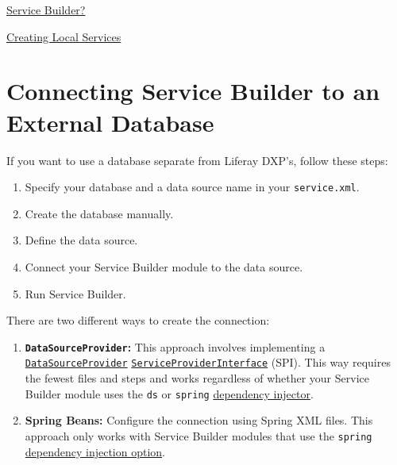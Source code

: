 \href{/docs/7-2/appdev/-/knowledge_base/a/service-builder}{Service
Builder?}

\href{/docs/7-2/appdev/-/knowledge_base/a/business-logic-with-service-builder}{Creating
Local Services}

\chapter{Connecting Service Builder to an External
Database}\label{connecting-service-builder-to-an-external-database}

If you want to use a database separate from Liferay DXP's, follow these
steps:

\begin{enumerate}
\def\labelenumi{\arabic{enumi}.}
\item
  Specify your database and a data source name in your
  \texttt{service.xml}.
\item
  Create the database manually.
\item
  Define the data source.
\item
  Connect your Service Builder module to the data source.
\item
  Run Service Builder.
\end{enumerate}

There are two different ways to create the connection:

\begin{enumerate}
\def\labelenumi{\arabic{enumi}.}
\item
  \textbf{\texttt{DataSourceProvider}:} This approach involves
  implementing a
  \href{https://docs.liferay.com/dxp/portal/7.2-latest/javadocs/portal-kernel/com/liferay/portal/kernel/dao/jdbc/DataSourceProvider.html}{\texttt{DataSourceProvider}}
  \href{https://docs.oracle.com/javase/tutorial/sound/SPI-intro.html}{\texttt{ServiceProviderInterface}}
  (SPI). This way requires the fewest files and steps and works
  regardless of whether your Service Builder module uses the \texttt{ds}
  or \texttt{spring}
  \href{/docs/7-2/appdev/-/knowledge_base/a/defining-global-service-information\#dependency-injector}{dependency
  injector}.
\item
  \textbf{Spring Beans:} Configure the connection using Spring XML
  files. This approach only works with Service Builder modules that use
  the \texttt{spring}
  \href{/docs/7-2/appdev/-/knowledge_base/a/defining-global-service-information\#dependency-injector}{dependency
  injection option}.
\end{enumerate}

